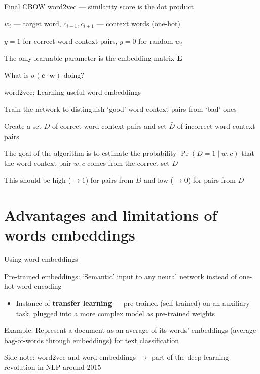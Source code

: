 \documentclass[12pt,aspectratio=169,handout]{beamer}
\begin{document}
\begin{frame}{Final CBOW word2vec --- similarity score is the dot product}
\begin{figure}
	\end{figure}	

\vspace{-1em}
	$w_i$ --- target word, $c_{i-1}, c_{i+1}$ --- context words (one-hot)
	
	$y = 1$ for correct word-context pairs, $y = 0$ for random $w_i$
	
	The only learnable parameter is the embedding matrix $\bm{E}$
	
	What is $\sigma(\bm{c} \cdot \bm{w})$ doing?
	
\end{frame}

\begin{frame}{word2vec: Learning useful word embeddings}
	
Train the network to distinguish `good' word-context pairs from `bad' ones

Create a set $D$ of correct word-context pairs and set $\bar{D}$ of incorrect word-context pairs

The goal of the algorithm is to estimate the probability $\Pr(D = 1 \mid w, c)$ that the word-context pair $w, c$ comes from the correct set $D$

This should be high ($\to 1$) for pairs from $D$ and low ($\to 0$) for pairs from $\bar{D}$
\end{frame}



\section{Advantages and limitations of words embeddings}

\begin{frame}{Using word embeddings}

Pre-trained embeddings: `Semantic' input to any neural network instead of one-hot word encoding
\begin{itemize}
	\item Instance of \textbf{transfer learning} --- pre-trained (self-trained) on an auxiliary task, plugged into a more complex model as pre-trained weights
\end{itemize}

Example: Represent a document as an average of its words' embeddings (average bag-of-words through embeddings) for text classification

\bigskip

Side note: word2vec and word embeddings $\to$ part of the deep-learning revolution in NLP around 2015

\end{frame}
\end{document}
